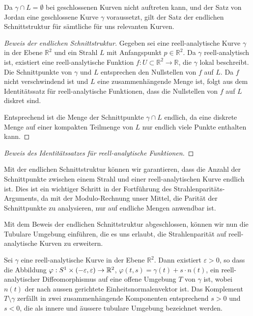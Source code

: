 Da $\gamma \cap L = \emptyset$ bei geschlossenen Kurven nicht auftreten kann, und der Satz von Jordan eine geschlossene Kurve $\gamma$ voraussetzt, gilt der Satz der endlichen Schnittstruktur für sämtliche für uns relevanten Kurven. 

\begin{proof}[Beweis der endlichen Schnittstruktur]

    Gegeben sei eine reell-analytische Kurve $\gamma$ in der Ebene $\mathbb{R}^2$ und ein Strahl $L$ mit Anfangspunkt $p \in \mathbb{R}^2$. 
    Da $\gamma$ reell-analytisch ist, existiert eine reell-analytische Funktion $f: U \subset \mathbb{R}^2 \to \mathbb{R}$, die $\gamma$ lokal beschreibt. 
    Die Schnittpunkte von $\gamma$ und $L$ entsprechen den Nullstellen von $f$ auf $L$. 
    Da $f$ nicht verschwindend ist und $L$ eine zusammenhängende Menge ist, folgt aus dem Identitätssatz für reell-analytische Funktionen, dass die Nullstellen von $f$ auf $L$ diskret sind. 

    Entsprechend ist die Menge der Schnittpunkte $\gamma \cap L$ endlich, da eine diskrete Menge auf einer kompakten Teilmenge von $L$ nur endlich viele Punkte enthalten kann.
\end{proof}

\begin{proof}[Beweis des Identitätssatzes für reell-analytische Funktionen]

\end{proof}

Mit der endlichen Schnittstruktur können wir garantieren, dass die Anzahl der Schnittpunkte zwischen einem Strahl und einer reell-analytischen Kurve endlich ist. 
Dies ist ein wichtiger Schritt in der Fortführung des Strahlenparitäts-Arguments, da mit der Modulo-Rechnung unser Mittel, die Parität der Schnittpunkte zu analysieren, nur auf endliche Mengen anwendbar ist. 

Mit dem Beweis der endlichen Schnittstruktur abgeschlossen, können wir nun die Tubulare Umgebung einführen, die es uns erlaubt, die Strahlenparität auf reell-analytische Kurven zu erweitern.

\begin{lemma}
    Sei $\gamma$ eine reell-analytische Kurve in der Ebene $\mathbb{R}^2$. Dann existiert $\varepsilon > 0$, so dass die Abbildung $\varphi: S\textsuperscript{1} \times (-\varepsilon, \varepsilon) \to \mathbb{R}^2$, $\varphi(t,s) = \gamma(t) + s \cdot n(t)$, ein reell-analytischer Diffeomorphismus auf eine offene Umgebung $T$ von $\gamma$ ist, wobei $n(t)$ der nach aussen gerichtete Einheitsnormalenvektor ist. 
    Das Komplement $T \setminus \gamma$ zerfällt in zwei zusammenhängende Komponenten entsprechend $s > 0$ und $s < 0$, die als innere und äussere tubulare Umgebung bezeichnet werden.    
\end{lemma}

